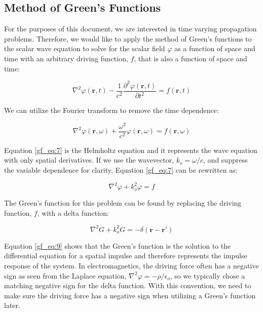 \subsection {Method of Green's Functions} \label{gf_sec:method}
For the purposes of this document, we are interested in time varying propagation problems. Therefore, we would like to apply the method of Green's functions to the scalar wave equation  to solve for the scalar field $\varphi$ as a function of space and time with an arbitrary driving function, $f$, that is also a function of space and time:

\begin{equation}
\nabla^2\varphi\left(\mathbf{r},t\right) - \frac{1}{c^2}\frac{\partial^2 \varphi\left(\mathbf{r},t\right)}{\partial t^2} = f\left(\mathbf{r},t\right)
\label{gf_eq:6}
\end{equation}
\renewcommand{\baselinestretch}{2} \small\normalsize

\noindent We can utilize the Fourier transform to remove the time dependence:

\begin{equation}
\nabla^2\varphi\left(\mathbf{r},\omega\right) + \frac{\omega^2}{c^2}\varphi\left(\mathbf{r},\omega\right) = f\left(\mathbf{r},\omega\right)
\label{gf_eq:7}
\end{equation}
\renewcommand{\baselinestretch}{2} \small\normalsize

Equation \ref{gf_eq:7} is the Helmholtz equation and it represents the wave equation with only spatial derivatives. If we use the wavevector, $k_o = \omega/c$, and suppress the variable dependence for clarity, Equation \ref{gf_eq:7} can be rewritten as:

\begin{equation}
\nabla^2\varphi + k_o^2\varphi = f
\label{gf_eq:8}
\end{equation}
\renewcommand{\baselinestretch}{2} \small\normalsize

The Green's function for this problem can be found by replacing the driving function, $f$, with a delta function:

\begin{equation}
\nabla^2G+ k_o^2G = -\delta\left(\mathbf{r}-\mathbf{r}' \right)
\label{gf_eq:9}
\end{equation}
\renewcommand{\baselinestretch}{2} \small\normalsize

Equation \ref{gf_eq:9} shows that the Green's function is the solution to the differential equation for a spatial impulse and therefore represents the impulse response of the system. In electromagnetics, the driving force often has a negative sign as seen from the Laplace equation, $\nabla^2\varphi = -\rho/\epsilon_o$, so we typically chose a matching negative sign for the delta function. With this convention, we need to make sure the driving force has a negative sign when utilizing a Green's function later.

